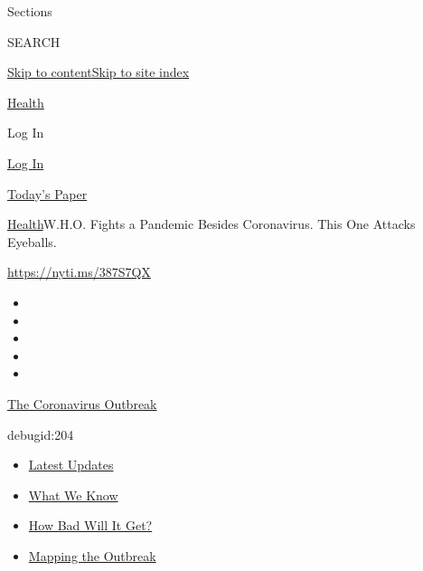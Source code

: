 Sections

SEARCH

\protect\hyperlink{site-content}{Skip to
content}\protect\hyperlink{site-index}{Skip to site index}

\href{https://web.archive.org/web/20200206210009/https://www.nytimes.com/section/health}{Health}

Log In

\href{https://web.archive.org/web/20200206210009/https://myaccount.nytimes.com/auth/login?response_type=cookie\&client_id=vi}{Log
In}

\href{https://web.archive.org/web/20200206210009/https://www.nytimes.com/section/todayspaper}{Today's
Paper}

\href{/web/20200206210009/https://www.nytimes.com/section/health}{Health}\textbar{}W.H.O.
Fights a Pandemic Besides Coronavirus. This One Attacks Eyeballs.

\url{https://nyti.ms/387S7QX}

\begin{itemize}
\item
\item
\item
\item
\item
\end{itemize}

\href{https://web.archive.org/web/20200206210009/https://www.nytimes.com/news-event/coronavirus}{The
Coronavirus Outbreak}

debugid:204

\begin{itemize}
\item
  \href{https://web.archive.org/web/20200206210009/https://www.nytimes.com/2020/02/06/world/asia/coronavirus-china.html?action=click\&pgtype=Article\&state=default\&module=styln-coronavirus®ion=TOP_BANNER\&context=storyline_menu}{Latest
  Updates}
\item
  \href{https://web.archive.org/web/20200206210009/https://www.nytimes.com/article/what-is-coronavirus.html?action=click\&pgtype=Article\&state=default\&module=styln-coronavirus®ion=TOP_BANNER\&context=storyline_menu}{What
  We Know}
\item
  \href{https://web.archive.org/web/20200206210009/https://www.nytimes.com/interactive/2020/world/asia/china-coronavirus-contain.html?action=click\&pgtype=Article\&state=default\&module=styln-coronavirus®ion=TOP_BANNER\&context=storyline_menu}{How
  Bad Will It Get?}
\item
  \href{https://web.archive.org/web/20200206210009/https://www.nytimes.com/interactive/2020/world/asia/china-wuhan-coronavirus-maps.html?action=click\&pgtype=Article\&state=default\&module=styln-coronavirus®ion=TOP_BANNER\&context=storyline_menu}{Mapping
  the Outbreak}
\end{itemize}

